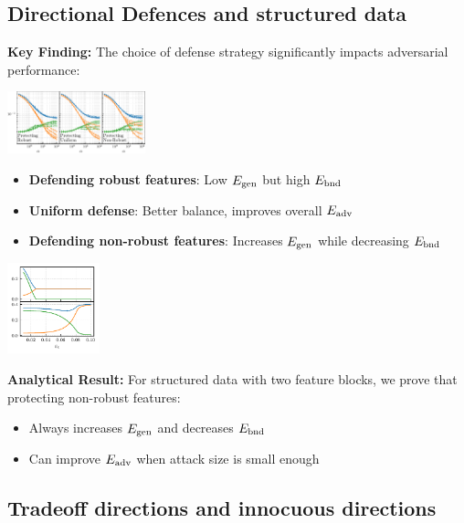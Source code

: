 \documentclass[a0paper,fleqn]{betterportraitposter}
\theoremstyle{plain}
\theoremstyle{definition}
\theoremstyle{remark}
\begin{document}
{\begin{multicols}{3}
\subsection{Directional Defences and structured data}

\textbf{Key Finding:} The choice of defense strategy significantly impacts adversarial performance:

\begin{center}
\includegraphics[width=0.3\textwidth]{Assets/defence_sweep.pdf}
\end{center}

\begin{itemize}
    \item \textbf{Defending robust features}: Low $E_{\mathrm{gen}}$ but high $E_{\mathrm{bnd}}$
    \item \textbf{Uniform defense}: Better balance, improves overall $E_{\mathrm{adv}}$
    \item \textbf{Defending non-robust features}: Increases $E_{\mathrm{gen}}$ while decreasing $E_{\mathrm{bnd}}$
\end{itemize}

\begin{center}
\includegraphics[width=0.2\textwidth]{Assets/optimal_defense.pdf}
\end{center}

\textbf{Analytical Result:} For structured data with two feature blocks, we prove that protecting non-robust features:
\begin{itemize}
    \item Always increases $E_{\mathrm{gen}}$ and decreases $E_{\mathrm{bnd}}$
    \item Can improve $E_{\mathrm{adv}}$ when attack size is small enough
\end{itemize}

\subsection{Tradeoff directions and innocuous directions}


\end{multicols}}
\end{document}
